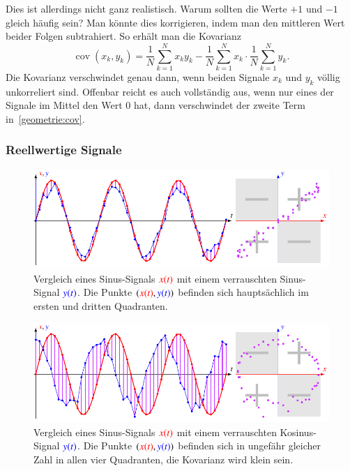 Dies ist allerdings nicht ganz realistisch.
Warum sollten die Werte $+1$ und $-1$ gleich häufig sein?
Man könnte dies korrigieren, indem man den mittleren Wert beider Folgen
subtrahiert.
So erhält man die Kovarianz
%
\begin{equation}
\operatorname{cov}(x_k,y_k)
=
\frac1{N} \sum_{k=1}^N x_ky_k
-
\frac1{N} \sum_{k=1}^N x_k
\cdot
\frac1{N} \sum_{k=1}^N y_k.
\label{geometrie:cov}
\end{equation}
Die Kovarianz verschwindet genau dann, wenn beiden Signale $x_k$ und $y_k$
völlig unkorreliert sind.
Offenbar reicht es auch vollständig aus, wenn nur eines der Signale
im Mittel den Wert $0$ hat, dann verschwindet der zweite Term
in~\eqref{geometrie:cov}.

\subsubsection{Reellwertige Signale}
\begin{figure}
\centering
\includegraphics[width=\hsize]{chapters/1-geometrie/images/sinsin.pdf}
\caption{Vergleich eines Sinus-Signals $\color{red}x(t)$ mit einem
verrauschten Sinus-Signal $\color{blue}y(t)$.
Die Punkte $({\color{red}x(t)},{\color{blue}y(t)})$ befinden sich
hauptsächlich im ersten und dritten Quadranten.
\label{geometrie:kovarianz:sinsin:image}}
\end{figure}
\begin{figure}
\centering
\includegraphics[width=\hsize]{chapters/1-geometrie/images/sincos.pdf}
\caption{Vergleich eines Sinus-Signals $\color{red}x(t)$ mit einem
verrauschten Kosinus-Signal $\color{blue}y(t)$.
Die Punkte $({\color{red}x(t)},{\color{blue}y(t)})$ befinden sich
in ungefähr gleicher Zahl in allen vier Quadranten, die Kovarianz
wird klein sein.
\label{geometrie:kovarianz:sincos:image}}
\end{figure}

